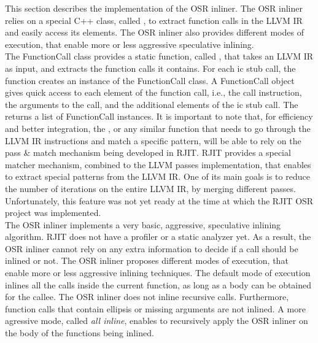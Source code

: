 This section describes the implementation of the OSR inliner.
The OSR inliner relies on a special C++ class, called , to extract function calls in the LLVM IR and easily access its elements. 
The OSR inliner also provides different modes of execution, that enable more or less aggressive speculative inlining.\\

The FunctionCall class provides a static function, called , that takes an LLVM IR as input, and extracts the function calls it contains.
For each ic stub call, the function creates an instance of the FunctionCall class. 
A FunctionCall object gives quick access to each element of the function call, i.e., the  call instruction, the arguments to the call, and the additional elements of the ic stub call.
The  returns a list of FunctionCall instances.
It is important to note that, for efficiency and better integration, the , or any similar function that needs to go through the LLVM IR instructions and match a specific pattern, will be able to rely on the pass \& match mechanism being developed in RJIT.
RJIT provides a special matcher mechanism, combined to the LLVM passes implementation, that enables to extract special patterns from the LLVM IR.
One of its main goals is to reduce the number of iterations on the entire LLVM IR, by merging different passes.
Unfortunately, this feature was not yet ready at the time at which the RJIT OSR project was implemented.\\

The OSR inliner implements a very basic, aggressive, speculative inlining algorithm. 
RJIT does not have a profiler or a static analyzer yet.
As a result, the OSR inliner cannot rely on any extra information to decide if a call should be inlined or not.
The OSR inliner proposes different modes of execution, that enable more or less aggressive inlining techniques.
The default mode of execution inlines all the calls inside the current function, as long as a body can be obtained for the callee.
The OSR inliner does not inline recursive calls.
Furthermore, function calls that contain ellipsis or missing arguments are not inlined.
A more agressive mode, called \textit{all inline}, enables to recursively apply the OSR inliner on the body of the functions being inlined.
\\


